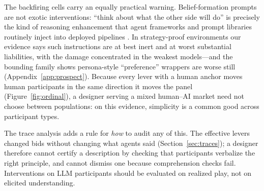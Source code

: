 The backfiring cells carry an equally practical warning. Belief-formation prompts are not exotic interventions: ``think about what the other side will do'' is precisely the kind of reasoning enhancement that agent frameworks and prompt libraries routinely inject into deployed pipelines \citep{fish2024algorithmic}. In strategy-proof environments our evidence says such instructions are at best inert and at worst substantial liabilities, with the damage concentrated in the weakest models---and the bounding family shows persona-style ``preference'' wrappers are worse still (Appendix~\ref{app:prospect}). Because every lever with a human anchor moves human participants in the same direction it moves the panel (Figure~\ref{fig:ordinal}), a designer serving a mixed human--AI market need not choose between populations: on this evidence, simplicity is a common good across participant types.

The trace analysis adds a rule for \emph{how} to audit any of this. The effective levers changed bids without changing what agents said (Section~\ref{sec:traces}); a designer therefore cannot certify a description by checking that participants verbalize the right principle, and cannot dismiss one because comprehension checks fail. Interventions on LLM participants should be evaluated on realized play, not on elicited understanding.


